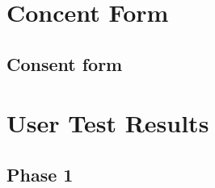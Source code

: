 \clearpage


\begin{appendix}

\chapter{Concent Form}

\section{Consent form}
\label{appendix:nsd}



\chapter{User Test Results}


\section{Phase 1}
\label{appendix:phase1}













\end{appendix}
